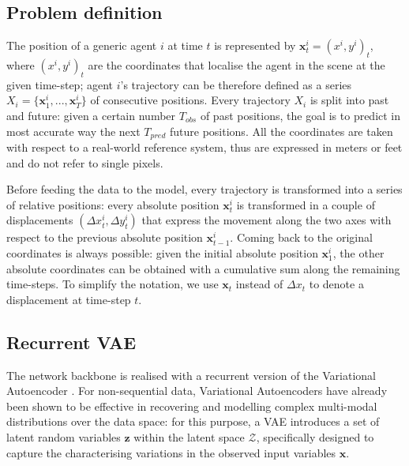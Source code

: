 \documentclass[10pt,a4paper,conference]{IEEEtran}
\begin{document}
\subsection{Problem definition}
The position of a generic agent $i$ at time $t$ is represented by $\mathbf{x}_{t}^{i}=(x^{i}, y^{i})_{t}$, where $(x^{i}, y^{i})_{t}$ are the coordinates that localise the agent in the scene at the given time-step; agent $i$'s trajectory can be therefore defined as a series $X_{i} = \{\mathbf{x}_{1}^{i},...,\mathbf{x}_{T}^{i}\}$ of consecutive positions. Every trajectory $X_{i}$ is split into past and future: given a certain number $T_{obs}$ of past positions, the goal is to predict in most accurate way the next $T_{pred}$ future positions. All the coordinates are taken with respect to a real-world reference system, thus are expressed in meters or feet and do not refer to single pixels.

Before feeding the data to the model, every trajectory is transformed into a series of relative positions: every absolute position $\mathbf{x}_{t}^{i}$ is transformed in a couple of displacements $(\Delta x_{t}^{i}, \Delta y_{t}^{i})$ that express the movement along the two axes with respect to the previous absolute position $\mathbf{x}_{t-1}^{i}$. Coming back to the original coordinates is always possible: given the initial absolute position $\mathbf{x}_{1}^{i}$, the other absolute coordinates can be obtained with a cumulative sum along the remaining time-steps. To simplify the notation, we use $\mathbf{x}_t$ instead of $\Delta x_{t}$ to denote a displacement at time-step $t$.

\subsection{Recurrent VAE}
The network backbone is realised with a recurrent version of the Variational Autoencoder \cite{deep_gen_models}. For non-sequential data, Variational Autoencoders have already been shown to be effective in recovering and modelling complex multi-modal distributions over the data space: for this purpose, a VAE introduces a set of latent random variables $\mathbf{z}$ within the latent space $\mathcal{Z}$, specifically designed to capture the characterising variations in the observed input variables $\mathbf{x}$.  
\end{document}
